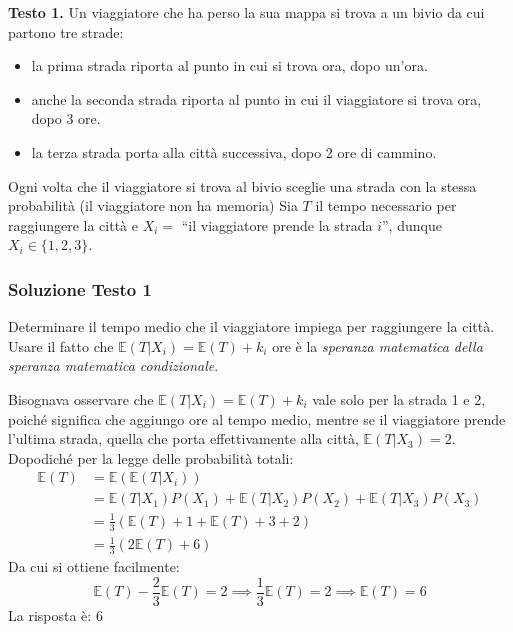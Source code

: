 \documentclass[12pt, a4paper]{article}
\begin{document}
\vspace{0.5cm}
\begin{tcolorbox}[colback=lightergray!10, colframe=tocsec, title=\textbf{Esercizio 3}]
\textbf{Testo 1.} Un viaggiatore che ha perso la sua mappa si trova a un bivio da cui partono tre strade:
\begin{itemize}
    \item la prima strada riporta al punto in cui si trova ora, dopo un’ora.
    \item anche la seconda strada riporta al punto in cui il viaggiatore si trova ora, dopo 3 ore.
    \item la terza strada porta alla città successiva, dopo 2 ore di cammino.
\end{itemize}
Ogni volta che il viaggiatore si trova al bivio sceglie una strada con la stessa probabilità (il viaggiatore non ha memoria)
Sia $T$ il tempo necessario per raggiungere la città e $X_i =$ ``il viaggiatore prende la strada $i$'', dunque $X_i \in \{1,2,3\}$.
\end{tcolorbox}

\newpage

\subsubsection*{Soluzione Testo 1}
Determinare il tempo medio che il viaggiatore impiega per raggiungere la città.
Usare il fatto che $\mathbb{E}(T|X_i) = \mathbb{E}(T) + k_i$ ore è la \textit{speranza matematica della speranza matematica condizionale}.

Bisognava osservare che $\mathbb{E}(T|X_i) = \mathbb{E}(T) + k_i$ vale solo per la strada 1 e 2, poiché significa che aggiungo ore al tempo medio, mentre se il viaggiatore prende l’ultima strada, quella che porta effettivamente alla città, $\mathbb{E}(T|X_3) = 2$.
Dopodiché per la legge delle probabilità totali:
$$ \begin{aligned} \mathbb{E}(T) &= \mathbb{E}(\mathbb{E}(T|X_i)) \\ &= \mathbb{E}(T|X_1)P(X_1) + \mathbb{E}(T|X_2)P(X_2) + \mathbb{E}(T|X_3)P(X_3) \\ &= \frac{1}{3} (\mathbb{E}(T) + 1 + \mathbb{E}(T) + 3 + 2) \\ &= \frac{1}{3} (2\mathbb{E}(T) + 6) \end{aligned} $$
Da cui si ottiene facilmente:
$$ \mathbb{E}(T) - \frac{2}{3}\mathbb{E}(T) = 2 \implies \frac{1}{3}\mathbb{E}(T) = 2 \implies \mathbb{E}(T) = 6 $$
La risposta è: 6
\end{document}

